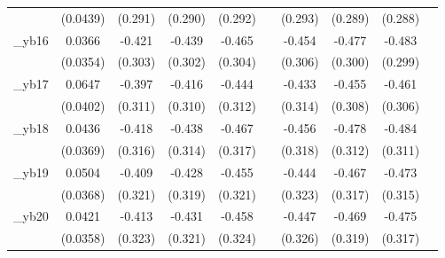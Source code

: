 \begin{table}[htbp]
\begin{tabular}{l*{9}{c}}
            &    (0.0439)         &     (0.291)         &     (0.290)         &     (0.292)         &                     &     (0.293)         &     (0.289)         &     (0.288)         &                     \\
[1em]
\_yb16       &      0.0366         &      -0.421         &      -0.439         &      -0.465         &                     &      -0.454         &      -0.477         &      -0.483         &                     \\
            &    (0.0354)         &     (0.303)         &     (0.302)         &     (0.304)         &                     &     (0.306)         &     (0.300)         &     (0.299)         &                     \\
[1em]
\_yb17       &      0.0647         &      -0.397         &      -0.416         &      -0.444         &                     &      -0.433         &      -0.455         &      -0.461         &                     \\
            &    (0.0402)         &     (0.311)         &     (0.310)         &     (0.312)         &                     &     (0.314)         &     (0.308)         &     (0.306)         &                     \\
[1em]
\_yb18       &      0.0436         &      -0.418         &      -0.438         &      -0.467         &                     &      -0.456         &      -0.478         &      -0.484         &                     \\
            &    (0.0369)         &     (0.316)         &     (0.314)         &     (0.317)         &                     &     (0.318)         &     (0.312)         &     (0.311)         &                     \\
[1em]
\_yb19       &      0.0504         &      -0.409         &      -0.428         &      -0.455         &                     &      -0.444         &      -0.467         &      -0.473         &                     \\
            &    (0.0368)         &     (0.321)         &     (0.319)         &     (0.321)         &                     &     (0.323)         &     (0.317)         &     (0.315)         &                     \\
[1em]
\_yb20       &      0.0421         &      -0.413         &      -0.431         &      -0.458         &                     &      -0.447         &      -0.469         &      -0.475         &                     \\
            &    (0.0358)         &     (0.323)         &     (0.321)         &     (0.324)         &                     &     (0.326)         &     (0.319)         &     (0.317)         &                     \\

\end{tabular}
\end{table}
